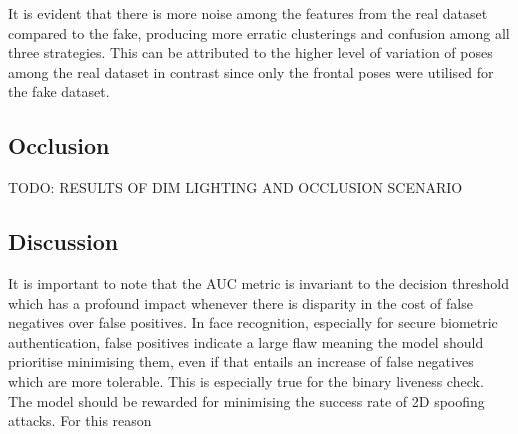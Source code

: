 \documentclass{mpaper}
\begin{document}
It is evident that there is more noise among the features from the real dataset compared to the fake, producing more erratic clusterings and confusion among all three strategies. This can be attributed to the higher level of variation of poses among the real dataset in contrast since only the frontal poses were utilised for the fake dataset. 


\subsection{Occlusion}
TODO: RESULTS OF DIM LIGHTING AND OCCLUSION SCENARIO
\begin{table}[htbp]
    \centering
    \vspace{-0.1cm}
    \vspace{0.1cm}
    \caption{TODO}
    \label{tab:occlusion_averaged_acc_fb}
    \vspace{-0.9cm}
\end{table}


\subsection{Discussion}
It is important to note that the AUC metric is invariant to the decision threshold which has a profound impact whenever there is disparity in the cost of false negatives over false positives. In face recognition, especially for secure biometric authentication, false positives indicate a large flaw meaning the model should prioritise minimising them, even if that entails an increase of false negatives which are more tolerable. This is especially true for the binary liveness check. The model should be rewarded for minimising the success rate of 2D spoofing attacks. For this reason
\end{document}
